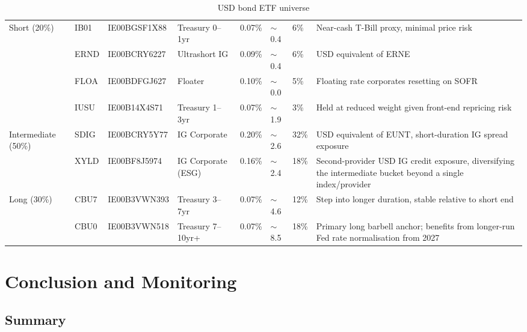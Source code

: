 \documentclass[11pt,a4paper]{article}
\begin{document}
\begin{table}[htbp]
\caption{USD bond ETF universe}
\footnotesize
\begin{tabularx}{\linewidth}{P{1.75cm} P{1.0cm} P{2.35cm} P{1.5cm} Q{0.8cm} Q{1.15cm} Q{0.95cm} L}
\toprule
{} &  &  &  &  &  &  &  \\
\midrule
Short (20\%) & IB01 & IE00BGSF1X88 & Treasury 0--1yr & 0.07\% & \(\sim\)0.4 & 6\% & Near-cash T-Bill proxy, minimal price risk \\
 & ERND & IE00BCRY6227 & Ultrashort IG & 0.09\% & \(\sim\)0.4 & 6\% & USD equivalent of ERNE \\
 & FLOA & IE00BDFGJ627 & Floater & 0.10\% & \(\sim\)0.0 & 5\% & Floating rate corporates resetting on SOFR \\
 & IUSU & IE00B14X4S71 & Treasury 1--3yr & 0.07\% & \(\sim\)1.9 & 3\% & Held at reduced weight given front-end repricing risk \\
\midrule
Intermediate (50\%) & SDIG & IE00BCRY5Y77 & IG Corporate & 0.20\% & \(\sim\)2.6 & 32\% & USD equivalent of EUNT, short-duration IG spread exposure \\
 & XYLD & IE00BF8J5974 & IG Corporate (ESG) & 0.16\% & \(\sim\)2.4 & 18\% & Second-provider USD IG credit exposure, diversifying the intermediate bucket beyond a single index/provider \\
\midrule
Long (30\%) & CBU7 & IE00B3VWN393 & Treasury 3--7yr & 0.07\% & \(\sim\)4.6 & 12\% & Step into longer duration, stable relative to short end \\
 & CBU0 & IE00B3VWN518 & Treasury 7--10yr+ & 0.07\% & \(\sim\)8.5 & 18\% & Primary long barbell anchor; benefits from longer-run Fed rate normalisation from 2027 \\
\bottomrule
\end{tabularx}
\end{table}

\section{Conclusion and Monitoring}

\subsection{Summary}
\end{document}
